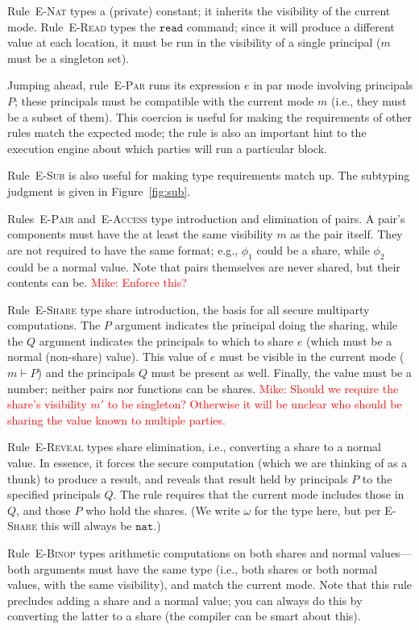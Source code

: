 \documentclass[10pt]{article}
\newcommand{\rulelab}[1]{{\small \textsc{#1}}}
\newcommand{\kw}[1]{\ensuremath{\mathtt{#1}}}
\newcommand{\tnat}{\ensuremath{\mathtt{nat}}}
\newcommand{\mwh}[1]{\textcolor{red}{Mike: #1}}
\begin{document}
Rule~\rulelab{E-Nat} types a (private) constant; it inherits the
visibility of the current mode. Rule~\rulelab{E-Read} types the
\kw{read} command; since it will produce a different value at each
location, it must be run in the visibility of a single principal ($m$
must be a singleton set).

Jumping ahead, rule~\rulelab{E-Par} runs its expression $e$ in par
mode involving principals $P$; these principals must be compatible
with the current mode $m$ (i.e., they must be a subset of them). This
coercion is useful for making the requirements of other rules match
the expected mode; the rule is also an important hint to the execution
engine about which parties will run a particular block.

Rule~\rulelab{E-Sub} is also useful for making type requirements match
up. The subtyping judgment is given in Figure~\ref{fig:sub}.

Rules~\rulelab{E-Pair} and~\rulelab{E-Access} type introduction and
elimination of pairs. A pair's components must have the 
at least the same visibility $m$ as the pair itself. They are not required to have the
same format; e.g., $\phi_1$ could be a share, while $\phi_2$ could be
a normal value. Note that pairs themselves are never shared, but their
contents can be. \mwh{Enforce this?}

Rule~\rulelab{E-Share} type share introduction, the basis for all secure
multiparty computations. The $P$ argument indicates the principal
doing the sharing, while the $Q$ argument indicates the principals to
which to share $e$ (which must be a normal (non-share)
value). This value of $e$ must be visible in the current mode ($m \vdash P$)
and the principals $Q$ must be present as well. Finally, the value
must be a number; neither pairs nor functions can be shares. 
\mwh{Should we require the share's visibility $m'$ to be singleton?
  Otherwise it will be unclear who should be sharing the value known
  to multiple parties.}

Rule~\rulelab{E-Reveal} types share elimination, i.e., converting a
share to a normal value. In essence, it forces the secure computation
(which we are thinking of as a thunk) to produce a result, and reveals
that result held by principals $P$ to the specified principals
$Q$. The rule requires that the current mode includes those in $Q$,
and those $P$ who hold the shares. (We write $\omega$ for the type
here, but per \rulelab{E-Share} this will always be $\tnat$.)

Rule~\rulelab{E-Binop} types arithmetic computations on both shares
and normal values---both arguments must have the same type (i.e., both
shares or both normal values, with the same visibility), and match the
current mode. Note that this rule precludes adding a 
share and a normal value; you can always do this by converting the
latter to a share (the compiler can be smart about this).
\end{document}
